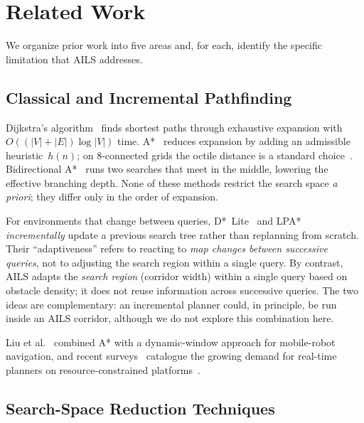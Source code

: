 \documentclass[journal]{IEEEtran}
\begin{document}
\section{Related Work}
\label{sec:related}

We organize prior work into five areas and, for each, identify the specific limitation that AILS addresses.

\subsection{Classical and Incremental Pathfinding}

Dijkstra's algorithm~\cite{dijkstra1959note} finds shortest paths through exhaustive expansion with $O((|V|+|E|)\log |V|)$ time.
A*~\cite{hart1968formal} reduces expansion by adding an admissible heuristic~$h(n)$; on 8-connected grids the octile distance is a standard choice~\cite{sturtevant2012benchmarks}.
Bidirectional A*~\cite{russell2016artificial} runs two searches that meet in the middle, lowering the effective branching depth.
None of these methods restrict the search space \emph{a priori}; they differ only in the order of expansion.

For environments that change between queries, D*~Lite~\cite{koenig2002d} and LPA*~\cite{koenig2004lifelong} \emph{incrementally} update a previous search tree rather than replanning from scratch.
Their ``adaptiveness'' refers to reacting to \emph{map changes between successive queries}, not to adjusting the search region within a single query.
By contrast, AILS adapts the \emph{search region} (corridor width) within a single query based on obstacle density; it does not reuse information across successive queries.
The two ideas are complementary: an incremental planner could, in principle, be run inside an AILS corridor, although we do not explore this combination here.

Liu et al.~\cite{liu2024hybrid} combined A* with a dynamic-window approach for mobile-robot navigation, and recent surveys~\cite{pmc2025review,bento2021autonomous} catalogue the growing demand for real-time planners on resource-constrained platforms~\cite{chen2024safety}.

\subsection{Search-Space Reduction Techniques}
\end{document}
